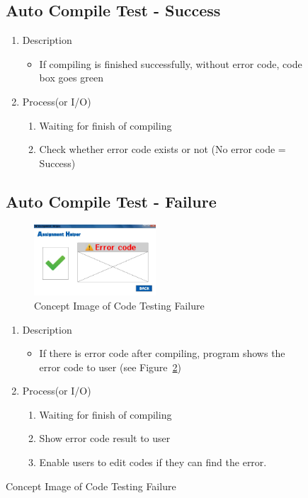 \documentclass[conference]{IEEEtran}
\begin{document}
\begin{itemize}
\begin{itemize}
\begin{itemize}
\begin{itemize}
\begin{figure}[h]
\textit{}

\subsection{Auto Compile Test - Success}

\begin{enumerate}
  \item Description
  \begin{itemize}
    \item If compiling is finished successfully, without error code, code box goes green
  \end{itemize}
  \item Process(or I/O)
  \begin{enumerate}
    \item Waiting for finish of compiling
    \item Check whether error code exists or not (No error code = Success)
  \end{enumerate}
\end{enumerate}

\textit{}

\subsection{Auto Compile Test - Failure}

\textit{}
\begin{figure}[h]
\centering
\includegraphics[width=0.5\textwidth]{./figures/UI_code_validation_fail.jpg}
\caption{Concept Image of Code Testing Failure}
\label{fig_concept_fail}
\end{figure}


\begin{enumerate}
  \item Description
  \begin{itemize}
    \item If there is error code after compiling, program shows the error code to user (see Figure~\ref{fig_concept_fail})
  \end{itemize}
  \item Process(or I/O)
  \begin{enumerate}
    \item Waiting for finish of compiling
    \item Show error code result to user
    \item Enable users to edit codes if they can find the error.
  \end{enumerate}
\end{enumerate}


\end{figure}
\end{itemize}
\end{itemize}
\end{itemize}
\end{itemize}
\end{document}
